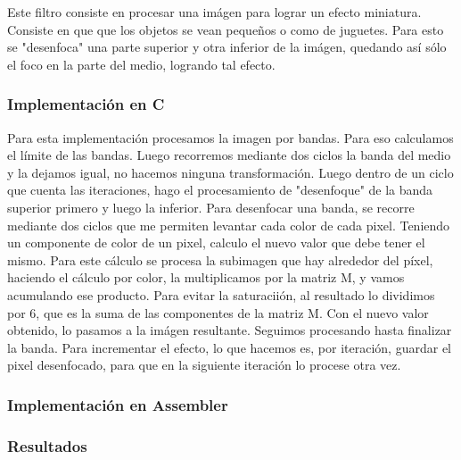 Este filtro consiste en procesar una im\'agen para lograr un efecto miniatura. Consiste en que que los objetos se vean pequeños o como de juguetes. Para esto se "desenfoca" una parte superior y otra inferior de la im\'agen, quedando as\'i s\'olo el foco en la parte del medio, logrando tal efecto.


\subsubsection{Implementación en C}
Para esta implementaci\'on procesamos la imagen por bandas.
Para eso calculamos el límite de las bandas. Luego recorremos mediante dos ciclos la banda del medio y la dejamos igual, no hacemos ninguna transformaci\'on.
Luego dentro de un ciclo que cuenta las iteraciones, hago el procesamiento de "desenfoque" de la banda superior primero y luego la inferior.
Para desenfocar una banda, se recorre mediante dos ciclos que me permiten levantar cada color de cada pixel. Teniendo un componente de color de un pixel, calculo el nuevo valor que debe tener el mismo. Para este c\'alculo se procesa la subimagen que hay alrededor del píxel, haciendo el c\'alculo por color, la multiplicamos por la matriz M, y vamos acumulando ese producto. Para evitar la saturacii\'on, al resultado lo dividimos por 6, que es la suma de las componentes de la matriz M. Con el nuevo valor obtenido, lo pasamos a la im\'agen resultante. Seguimos procesando hasta finalizar la banda.
Para incrementar el efecto, lo que hacemos es, por iteraci\'on, guardar el pixel desenfocado, para que en la siguiente iteración lo procese otra vez.

\subsubsection{Implementación en Assembler}


\subsubsection{Resultados}
